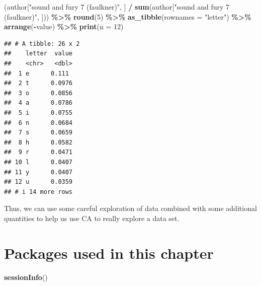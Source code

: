 \documentclass[
]{book}
\newenvironment{Shaded}{\begin{snugshade}}{\end{snugshade}}
\newcommand{\AttributeTok}[1]{\textcolor[rgb]{0.13,0.29,0.53}{#1}}
\newcommand{\DecValTok}[1]{\textcolor[rgb]{0.00,0.00,0.81}{#1}}
\newcommand{\FunctionTok}[1]{\textcolor[rgb]{0.13,0.29,0.53}{\textbf{#1}}}
\newcommand{\NormalTok}[1]{#1}
\newcommand{\SpecialCharTok}[1]{\textcolor[rgb]{0.81,0.36,0.00}{\textbf{#1}}}
\newcommand{\StringTok}[1]{\textcolor[rgb]{0.31,0.60,0.02}{#1}}
\begin{document}
\begin{Shaded}
\begin{Highlighting}[]
\NormalTok{(author[}\StringTok{"sound and fury 7 (faulkner)"}\NormalTok{, ] }\SpecialCharTok{/} \FunctionTok{sum}\NormalTok{(author[}\StringTok{"sound and fury 7 (faulkner)"}\NormalTok{, ])) }\SpecialCharTok{\%\textgreater{}\%}
  \FunctionTok{round}\NormalTok{(}\DecValTok{5}\NormalTok{) }\SpecialCharTok{\%\textgreater{}\%}
  \FunctionTok{as\_tibble}\NormalTok{(}\AttributeTok{rownames =} \StringTok{"letter"}\NormalTok{) }\SpecialCharTok{\%\textgreater{}\%}
  \FunctionTok{arrange}\NormalTok{(}\SpecialCharTok{{-}}\NormalTok{value) }\SpecialCharTok{\%\textgreater{}\%}
  \FunctionTok{print}\NormalTok{(}\AttributeTok{n =} \DecValTok{12}\NormalTok{)}
\end{Highlighting}
\end{Shaded}

\begin{verbatim}
## # A tibble: 26 x 2
##    letter  value
##    <chr>   <dbl>
##  1 e      0.111 
##  2 t      0.0976
##  3 o      0.0856
##  4 a      0.0786
##  5 i      0.0755
##  6 n      0.0684
##  7 s      0.0659
##  8 h      0.0582
##  9 r      0.0471
## 10 l      0.0407
## 11 y      0.0407
## 12 u      0.0359
## # i 14 more rows
\end{verbatim}

Thus, we can use some careful exploration of data combined with some additional quantities to help us use CA to really explore a data set.

\section{Packages used in this chapter}\label{packages-used-in-this-chapter-9}

\begin{Shaded}
\begin{Highlighting}[]
\FunctionTok{sessionInfo}\NormalTok{()}
\end{Highlighting}
\end{Shaded}
\end{document}
